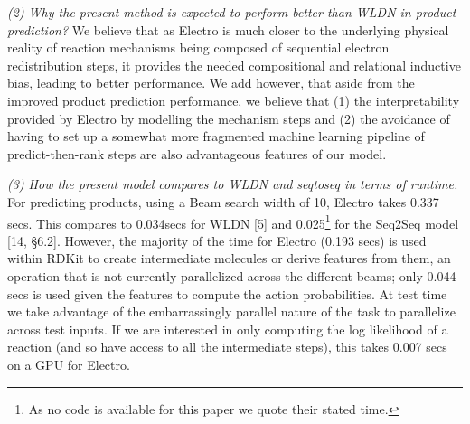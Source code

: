 \documentclass{article}
\begin{document}
\emph{(2) Why the present method is expected to perform better than WLDN in product prediction?}
We believe that as Electro is much closer to the underlying physical reality of reaction mechanisms being composed of sequential electron redistribution steps, it provides the needed compositional and relational inductive bias, leading to better performance.
 We add however, that aside from the improved product prediction performance, we believe that (1) the interpretability provided by Electro by modelling the mechanism steps and (2) the avoidance of having to set up a somewhat more fragmented machine learning pipeline of predict-then-rank steps are also advantageous features of our model.

\emph{(3) How the present model compares to WLDN and seqtoseq in terms of runtime.}
For predicting products, using a Beam search width of 10, Electro takes 0.337 secs. This compares to 0.034secs for WLDN [5] and 0.025\footnote{As no code is available for this paper we quote their stated time.} for the Seq2Seq model [14, \S6.2]. 
 However, the majority of the time for Electro (0.193 secs) is used within RDKit to create intermediate molecules or derive features from them, an operation that is not currently parallelized across the different beams; only 0.044 secs is used given the features to compute the action probabilities.
  At test time we take advantage of the embarrassingly parallel nature of the task to parallelize across test inputs. 
   If we are interested in only computing the log likelihood of a reaction (and so have access to all the intermediate steps), this takes 0.007 secs on a GPU for Electro. 
\end{document}
